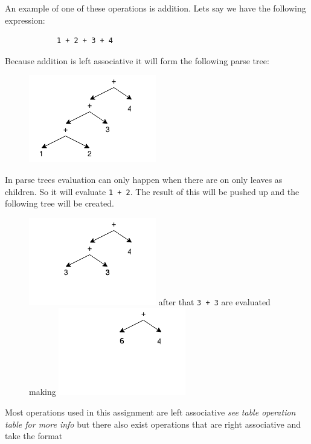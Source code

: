 \documentclass{article}
\newcommand{\code}[1]{\texttt{\textmd{#1}}}
\begin{document}
		An example of one of these operations is addition. Lets say we have the following expression:
		
		\begin{lstlisting}
			1 + 2 + 3 + 4
		\end{lstlisting}
		
		Because addition is left associative it will form the following parse tree:
		
		\begin{figure}[H]
			\centering
			\includegraphics{static/left-assoc-plus.png}
		\end{figure}
		
		In parse trees evaluation can only happen when there are on only leaves as children. So it will evaluate
		\code{1 + 2}. The result of this will be pushed up and the following tree will be created.
		
		\begin{figure}[H]
			\centering
			\includegraphics{static/left-assoc-plus-2.png} after that \code{3 + 3} are evaluated making
			\includegraphics{static/left-assoc-plus-3.png}
		\end{figure}
		
		Most operations used in this assignment are left associative \textit{see table operation table for more info}
		but there also exist operations that are right associative and take the format
		
\end{document}
